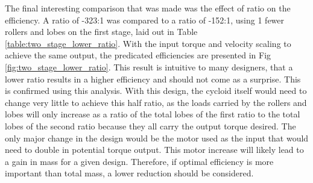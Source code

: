 The final interesting comparison that was made was the effect of ratio on the efficiency. A ratio of -323:1 was compared to a ratio of -152:1, using 1 fewer rollers and lobes on the first stage, laid out in Table \ref{table:two_stage_lower_ratio}. With the input torque and velocity scaling to achieve the same output, the predicated efficiencies are presented in Fig \ref{fig:two_stage_lower_ratio}. This result is intuitive to many designers, that a lower ratio results in a higher efficiency and should not come as a surprise. This is confirmed using this analysis. With this design, the cycloid itself would need to change very little to achieve this half ratio, as the loads carried by the rollers and lobes will only increase as a ratio of the total lobes of the first ratio to the total lobes of the second ratio because they all carry the output torque desired. The only major change in the design would be the motor used as the input that would need to double in potential torque output. This motor increase will likely lead to a gain in mass for a given design. Therefore, if optimal efficiency is more important than total mass, a lower reduction should be considered. 

